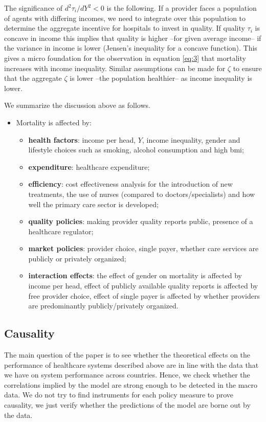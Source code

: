\documentclass{article}
\begin{document}
The significance of \(d^2 \tau_i /dY^2 <0\) is the following. If a provider faces a population of agents with differing incomes, we need to integrate over this population to determine the aggregate incentive for hospitals to invest in quality. If quality \(\tau_i\) is concave in income this implies that quality is higher --for given average income-- if the variance in income is lower (Jensen's inequality for a concave function). This gives a micro foundation for the observation in equation \eqref{eq:3} that mortality increases with income inequality. Similar assumptions can be made for \(\zeta\) to ensure that the aggregate \(\zeta\) is lower --the population healthier-- as income inequality is lower.

We summarize the discussion above as follows.

\begin{itemize}
\item Mortality is affected by:
\begin{itemize}
\item \textbf{health factors}:  income per head, \(Y\), income inequality, gender and lifestyle choices such as smoking, alcohol consumption and high bmi;
\item \textbf{expenditure}: healthcare expenditure;
\item \textbf{efficiency}: cost effectiveness analysis for the introduction of new treatments, the use of nurses (compared to doctors/specialists) and how well the primary care sector is developed;
\item \textbf{quality policies}: making provider quality reports public, presence of a healthcare regulator;
\item \textbf{market policies}: provider choice, single payer, whether care services are publicly or privately organized;
\item \textbf{interaction effects}: the effect of gender on mortality is affected by income per head, effect of publicly available quality reports is affected by free provider choice, effect of single payer is affected by whether providers are predominantly publicly/privately organized.
\end{itemize}
\end{itemize}

\subsection{Causality}
\label{sec:org37e5ae8}

The main question of the paper is to see whether the theoretical effects on the performance of healthcare systems described above are in line with the data that we have on system performance across countries. Hence, we check whether the correlations implied by the model are strong enough to be detected in the macro data. We do not try to find instruments for each policy measure to prove causality, we just verify whether the predictions of the model are borne out by the data.
\end{document}
